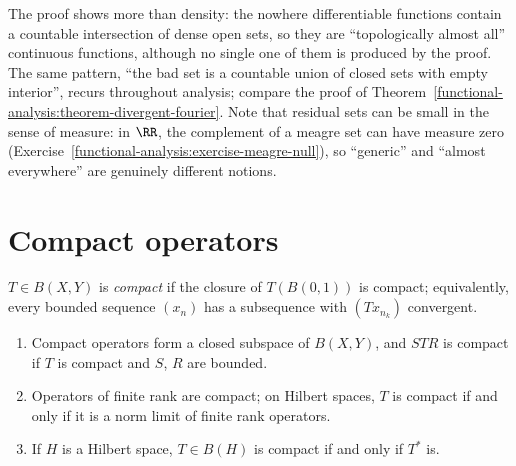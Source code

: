 The proof shows more than density: the nowhere differentiable functions contain a countable intersection of dense open sets, so they are ``topologically almost all'' continuous functions, although
no single one of them is produced by the proof. The same pattern, ``the bad set is a countable union of closed sets with empty interior'', recurs throughout analysis; compare the proof of
Theorem~\ref{functional-analysis:theorem-divergent-fourier}. Note that residual sets can be small in the sense of measure: in $\RR$, the complement of a meagre set can have measure zero
(Exercise~\ref{functional-analysis:exercise-meagre-null}), so ``generic'' and ``almost everywhere'' are genuinely different notions.

\section{Compact operators}\label{functional-analysis:section-compact-operators}

\begin{definition}\label{functional-analysis:definition-compact-operator}
$T \in B(X, Y)$ is \emph{compact} if the closure of $T(B(0,1))$ is compact; equivalently, every bounded sequence $(x_n)$ has a subsequence with $(Tx_{n_k})$ convergent.
\end{definition}

\begin{proposition}\label{functional-analysis:proposition-compact-operators}
\begin{enumerate}
\item Compact operators form a closed subspace of $B(X, Y)$, and $STR$ is compact if $T$ is compact and $S$, $R$ are bounded.
\item Operators of finite rank are compact; on Hilbert spaces, $T$ is compact if and only if it is a norm limit of finite rank operators.
\item If $H$ is a Hilbert space, $T \in B(H)$ is compact if and only if $T^*$ is.
\end{enumerate}
\end{proposition}

